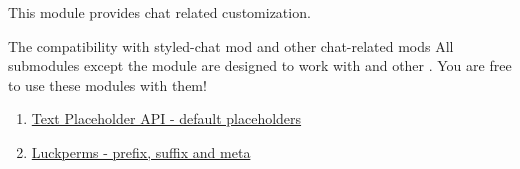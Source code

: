 This module provides chat related customization.

\begin{note}{The compatibility with styled-chat mod and other chat-related mods}
    All submodules except the  module are designed to work with  and other .
    You are free to use these modules with them!
\end{note}

\begin{enumerate}
    \item \href{https://placeholders.pb4.eu/user/default-placeholders/}{Text Placeholder API - default placeholders}
    \item \href{https://luckperms.net/wiki/Prefixes,-Suffixes-&-Meta}{Luckperms - prefix, suffix and meta}
\end{enumerate}


\clearpage


\clearpage


\clearpage


\clearpage


\clearpage


\clearpage


\clearpage


